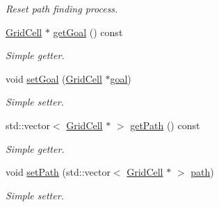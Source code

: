 \begin{DoxyCompactItemize}
\begin{DoxyCompactList}\small\item\em Reset path finding process. \end{DoxyCompactList}\item 
\hyperlink{classGridCell}{Grid\+Cell} $\ast$ \hyperlink{classRobot_affcb4c5da6b12767dfcd72c326a7700d}{get\+Goal} () const 
\begin{DoxyCompactList}\small\item\em Simple getter. \end{DoxyCompactList}\item 
void \hyperlink{classRobot_a1217544214600ddd32ff2f060f1bee15}{set\+Goal} (\hyperlink{classGridCell}{Grid\+Cell} $\ast$\hyperlink{classRobot_a5abff8bb9893b5fbd509c20e7fa2ffb5}{goal})
\begin{DoxyCompactList}\small\item\em Simple setter. \end{DoxyCompactList}\item 
std\+::vector$<$ \hyperlink{classGridCell}{Grid\+Cell} $\ast$ $>$ \hyperlink{classRobot_a4b33fb1546feb63a73f75a9c073d6d6f}{get\+Path} () const 
\begin{DoxyCompactList}\small\item\em Simple getter. \end{DoxyCompactList}\item 
void \hyperlink{classRobot_a12b5d95d7764f62b83ed237d18399f13}{set\+Path} (std\+::vector$<$ \hyperlink{classGridCell}{Grid\+Cell} $\ast$ $>$ \hyperlink{classRobot_a6a62d6834a3be1352b81d380cc396e7b}{path})
\begin{DoxyCompactList}\small\item\em Simple setter. \end{DoxyCompactList}\end{DoxyCompactItemize}
